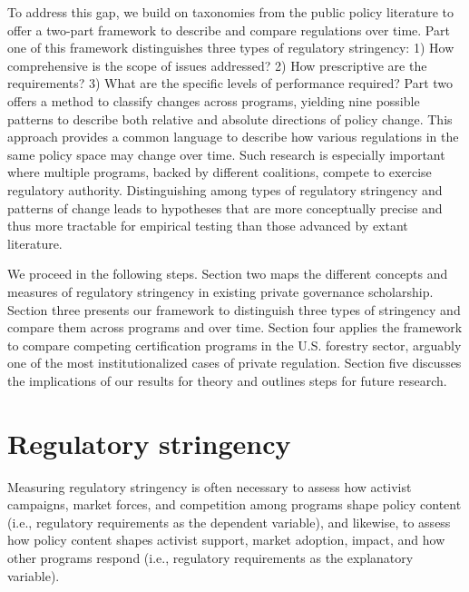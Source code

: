 \documentclass[
      12pt,
            Review ]{article}
\begin{document}
To address this gap, we build on taxonomies from the public policy
literature to offer a two-part framework to describe and compare
regulations over time. Part one of this framework distinguishes three
types of regulatory stringency: 1) How comprehensive is the scope of
issues addressed? 2) How prescriptive are the requirements? 3) What are
the specific levels of performance required? Part two offers a method to
classify changes across programs, yielding nine possible patterns to
describe both relative and absolute directions of policy change. This
approach provides a common language to describe how various regulations
in the same policy space may change over time. Such research is
especially important where multiple programs, backed by different
coalitions, compete to exercise regulatory authority. Distinguishing
among types of regulatory stringency and patterns of change leads to
hypotheses that are more conceptually precise and thus more tractable
for empirical testing than those advanced by extant literature.

We proceed in the following steps. Section two maps the different
concepts and measures of regulatory stringency in existing private
governance scholarship. Section three presents our framework to
distinguish three types of stringency and compare them across programs
and over time. Section four applies the framework to compare competing
certification programs in the U.S. forestry sector, arguably one of the
most institutionalized cases of private regulation. Section five
discusses the implications of our results for theory and outlines steps
for future research.

\section{Regulatory stringency}\label{regulatory-stringency}

Measuring regulatory stringency is often necessary to assess how
activist campaigns, market forces, and competition among programs shape
policy content (i.e., regulatory requirements as the dependent
variable), and likewise, to assess how policy content shapes activist
support, market adoption, impact, and how other programs respond (i.e.,
regulatory requirements as the explanatory variable).
\end{document}
